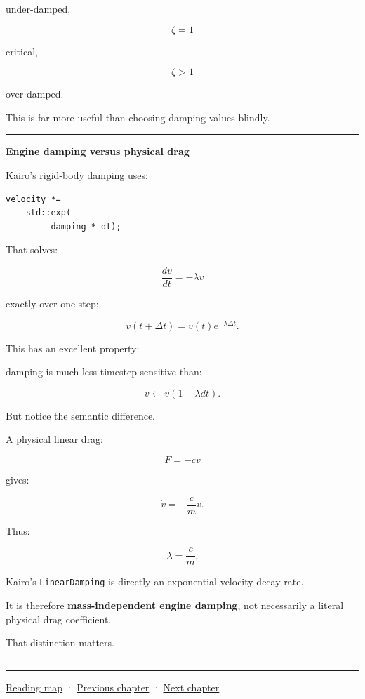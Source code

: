 under-damped,

\[
\zeta=1
\]

critical,

\[
\zeta>1
\]

over-damped.

This is far more useful than choosing damping values blindly.

\begin{center}\rule{0.5\linewidth}{0.5pt}\end{center}

\textbf{Engine damping versus physical drag}

Kairo's rigid-body damping uses:

\begin{verbatim}
velocity *=
    std::exp(
        -damping * dt);
\end{verbatim}

That solves:

\[
\frac{dv}{dt}
=
-\lambda v
\]

exactly over one step:

\[
\boxed{
v(t+\Delta t)
=
v(t)e^{-\lambda\Delta t}.
}
\]

This has an excellent property:

damping is much less timestep-sensitive than:

\[
v\leftarrow v(1-\lambda dt).
\]

But notice the semantic difference.

A physical linear drag:

\[
F=-cv
\]

gives:

\[
\dot v
=
-\frac{c}{m}v.
\]

Thus:

\[
\lambda
=
\frac{c}{m}.
\]

Kairo's \texttt{LinearDamping} is directly an exponential velocity-decay rate.

It is therefore \textbf{mass-independent engine damping}, not necessarily a literal physical drag coefficient.

That distinction matters.

\begin{center}\rule{0.5\linewidth}{0.5pt}\end{center}

\begin{center}\rule{0.5\linewidth}{0.5pt}\end{center}

\hyperref[volume-reading-map]{Reading map} · \hyperref[06-engine-ii-ch033]{Previous chapter} · \hyperref[06-engine-ii-ch035]{Next chapter}
